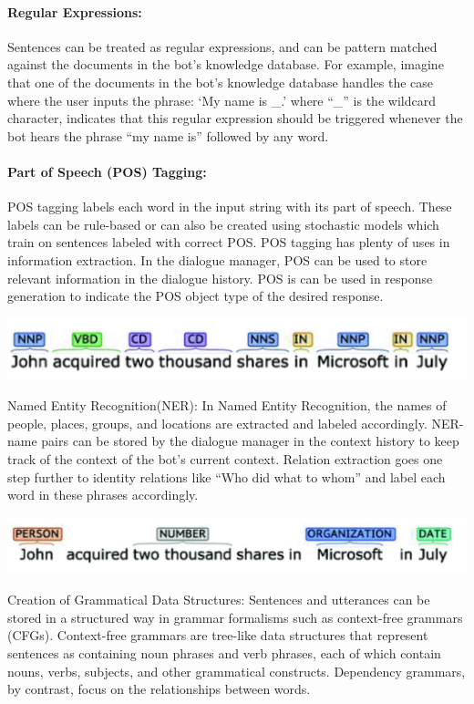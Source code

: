 \paragraph*{Regular Expressions:}

Sentences can be treated as regular expressions, and can be pattern matched
against the documents in the bot’s knowledge database. For example, imagine that
one of the documents in the bot’s knowledge database handles the case where the
user inputs the phrase: ‘My name is \_.’ where “\_” is the wildcard character,
indicates that this regular expression should be triggered whenever the bot
hears the phrase “my name is” followed by any word. 

\paragraph*{Part of Speech (POS) Tagging:}

POS tagging labels each word in the input string with its part of speech. These
labels can be rule-based or can also be created using stochastic models which
train on sentences labeled with correct POS. POS tagging has plenty of uses in
information extraction. In the dialogue manager, POS can be used to store
relevant information in the dialogue history. POS is can be used in response
generation to indicate the POS object type of the desired response.

\includegraphics[width=\linewidth]{5.png}

Named Entity Recognition(NER): In Named Entity Recognition, the names of people,
places, groups, and locations are extracted and labeled accordingly. NER-name
pairs can be stored by the dialogue manager in the context history to keep track
of the context of the bot’s current context. Relation extraction goes one step
further to identity relations like “Who did what to whom” and label each word in
these phrases accordingly.

\includegraphics[width=\linewidth]{6.png}

Creation of Grammatical Data Structures: Sentences and utterances can be stored
in a structured way in grammar formalisms such as context-free grammars (CFGs).
Context-free grammars are tree-like data structures that represent sentences as
containing noun phrases and verb phrases, each of which contain nouns, verbs,
subjects, and other grammatical constructs. Dependency grammars, by contrast,
focus on the relationships between words.

